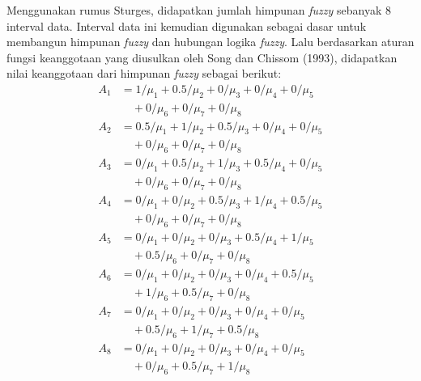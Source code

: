 \documentclass[conference]{IEEEtran}
\begin{document}
Menggunakan rumus Sturges, didapatkan jumlah himpunan \textit{fuzzy} sebanyak 8 interval data. Interval data ini kemudian digunakan sebagai dasar untuk membangun himpunan \textit{fuzzy} dan hubungan logika \textit{fuzzy}. Lalu berdasarkan aturan fungsi keanggotaan yang diusulkan oleh Song dan Chissom (1993), didapatkan nilai keanggotaan dari himpunan \textit{fuzzy} sebagai berikut:
\begin{equation*}
    \label{eq:2}
    \begin{aligned}
        A_1 &= 1/{\mu_1} + 0.5/{\mu_2} + 0/{\mu_3} + 0/{\mu_4} + 0/{\mu_5} \\ 
            &\quad + 0/{\mu_6} + 0/{\mu_7} + 0/{\mu_8}\\
        A_2 &= 0.5/{\mu_1} + 1/{\mu_2} + 0.5/{\mu_3} + 0/{\mu_4} + 0/{\mu_5} \\ 
            &\quad + 0/{\mu_6} + 0/{\mu_7} + 0/{\mu_8}\\
        A_3 &= 0/{\mu_1} + 0.5/{\mu_2} + 1/{\mu_3} + 0.5/{\mu_4} + 0/{\mu_5} \\
            &\quad + 0/{\mu_6} + 0/{\mu_7} + 0/{\mu_8}\\
        A_4 &= 0/{\mu_1} + 0/{\mu_2} + 0.5/{\mu_3} + 1/{\mu_4} + 0.5/{\mu_5} \\
            &\quad + 0/{\mu_6} + 0/{\mu_7} + 0/{\mu_8}\\
        A_5 &= 0/{\mu_1} + 0/{\mu_2} + 0/{\mu_3} + 0.5/{\mu_4} + 1/{\mu_5} \\
            &\quad + 0.5/{\mu_6} + 0/{\mu_7} + 0/{\mu_8}\\
        A_6 &= 0/{\mu_1} + 0/{\mu_2} + 0/{\mu_3} + 0/{\mu_4} + 0.5/{\mu_5} \\
            &\quad + 1/{\mu_6} + 0.5/{\mu_7} + 0/{\mu_8}\\
        A_7 &= 0/{\mu_1} + 0/{\mu_2} + 0/{\mu_3} + 0/{\mu_4} + 0/{\mu_5} \\
            &\quad + 0.5/{\mu_6} + 1/{\mu_7} + 0.5/{\mu_8}\\
        A_8 &= 0/{\mu_1} + 0/{\mu_2} + 0/{\mu_3} + 0/{\mu_4} + 0/{\mu_5} \\
            &\quad + 0/{\mu_6} + 0.5/{\mu_7} + 1/{\mu_8}
    \end{aligned}
    \end{equation*}
\end{document}
